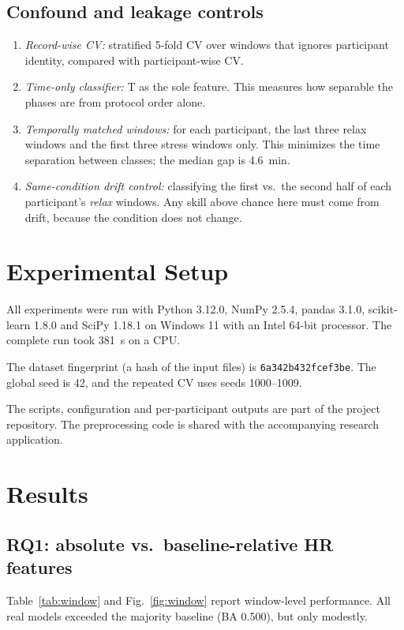 \documentclass[conference]{IEEEtran}
\begin{document}
\subsection{Confound and leakage controls}
\begin{enumerate}
\item \emph{Record-wise CV:} stratified 5-fold CV over windows that ignores participant identity, compared with participant-wise CV.
\item \emph{Time-only classifier:} T as the sole feature. This measures how separable the phases are from protocol order alone.
\item \emph{Temporally matched windows:} for each participant, the last three relax windows and the first three stress windows only. This minimizes the time separation between classes; the median gap is 4.6~min.
\item \emph{Same-condition drift control:} classifying the first vs.\ the second half of each participant's \emph{relax} windows. Any skill above chance here must come from drift, because the condition does not change.
\end{enumerate}

\section{Experimental Setup}
All experiments were run with Python 3.12.0, NumPy 2.5.4, pandas 3.1.0, scikit-learn 1.8.0 and SciPy 1.18.1 on Windows 11 with an Intel 64-bit processor. The complete run took 381~s on a CPU.

The dataset fingerprint (a hash of the input files) is \texttt{6a342b432fcef3be}. The global seed is 42, and the repeated CV uses seeds 1000--1009.

The scripts, configuration and per-participant outputs are part of the project repository. The preprocessing code is shared with the accompanying research application.

\section{Results}
\subsection{RQ1: absolute vs.\ baseline-relative HR features}
Table~\ref{tab:window} and Fig.~\ref{fig:window} report window-level performance. All real models exceeded the majority baseline (BA 0.500), but only modestly.
\end{document}

